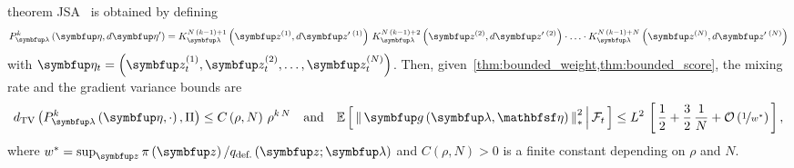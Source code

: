 
\begin{theoremEnd}{theorem}\label{thm:jsa}
  JSA~\citep{pmlr-v124-ou20a} is obtained by defining 
  {%
  \begin{align*}
  P_{\vlambda}^k\left(\veta, d\veta^{\prime}\right)
  = 
  K_{\vlambda}^{N\,\left(k-1\right) + 1}\left(\vz^{(1)}, d\vz^{\prime\;(1)}\right)
  \,
  K_{\vlambda}^{N\,\left(k-1\right) + 2}\left(\vz^{(2)}, d\vz^{\prime\;(2)}\right)
  \cdot
  \ldots 
  \cdot
  K_{\vlambda}^{N\,\left(k-1\right) + N}\left(\vz^{(N)}, d\vz^{\prime\;(N)}\right)
  \end{align*}
  }
  with \(\veta_t = \left(\vz_t^{(1)}, \vz_t^{(2)}, \ldots, \vz_t^{(N)}\right)\).
  Then, given~\cref{thm:bounded_weight,thm:bounded_score}, the mixing rate and the gradient variance bounds are
  {%
  \begin{align*}
    \DTV{P_{\vlambda}^k\left(\veta, \cdot\right)}{\Pi}
    \leq
    C\left(\rho, N\right)\,{\rho}^{k\,N}
    \quad\text{and}\quad
    \E{ \norm{ \vg\left(\vlambda, \rvveta\right) }^2_{*} \,\middle|\, \mathcal{F}_{t} }
    \leq
    L^2 \,
    \left[\,
    \frac{1}{2} + \frac{3}{2}\,\frac{1}{N}
    + \mathcal{O}\left(\nicefrac{1}{w^*}\right)
    \,\right],
  \end{align*}
  }%
  where \(w^* = \sup_{\vz} \pi\left(\vz\right) / q_{\text{def.}}\left(\vz;\vlambda\right)\) and \(C\left(\rho, N\right) > 0\) is a finite constant depending on \(\rho\) and \(N\).
\end{theoremEnd}
